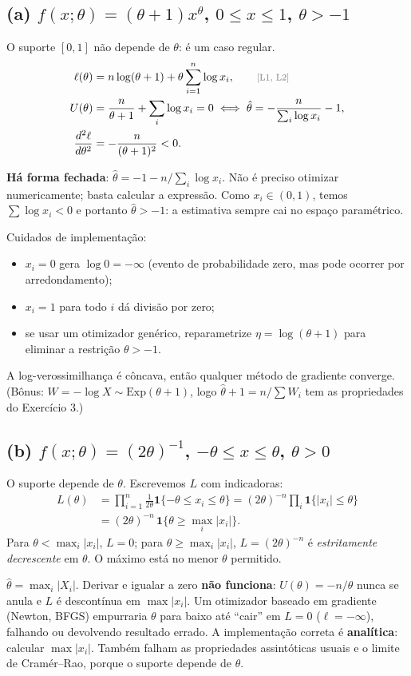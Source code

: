 \documentclass[11pt,a4paper]{article}
\newcommand{\ind}{\mathbf{1}}
\newcommand{\just}[1]{\tag*{\footnotesize\textcolor{gray}{[#1]}}}
\theoremstyle{definition}
\theoremstyle{plain}
\begin{document}
\subsection*{(a) $f(x;\theta)=(\theta+1)x^\theta$, $0\le x\le1$, $\theta>-1$}
O suporte $[0,1]$ não depende de $\theta$: é um caso regular.
\begin{align*}
\ell(\theta)&=n\log(\theta+1)+\theta\sum_{i=1}^n\log x_i, \just{L1, L2}\\
U(\theta)&=\frac{n}{\theta+1}+\sum_i\log x_i=0\iff\hat\theta=-\frac{n}{\sum_i\log x_i}-1,\\
\frac{d^2\ell}{d\theta^2}&=-\frac{n}{(\theta+1)^2}<0 .
\end{align*}
\begin{resposta}
\textbf{Há forma fechada}: $\hat\theta=-1-n/\sum_i\log x_i$. Não é preciso otimizar numericamente; basta calcular a expressão. Como $x_i\in(0,1)$, temos $\sum\log x_i<0$ e portanto $\hat\theta>-1$: a estimativa sempre cai no espaço paramétrico.

Cuidados de implementação:
\begin{itemize}[leftmargin=1.2em]
\item $x_i=0$ gera $\log0=-\infty$ (evento de probabilidade zero, mas pode ocorrer por arredondamento);
\item $x_i=1$ para todo $i$ dá divisão por zero;
\item se usar um otimizador genérico, reparametrize $\eta=\log(\theta+1)$ para eliminar a restrição $\theta>-1$.
\end{itemize}
A log-verossimilhança é côncava, então qualquer método de gradiente converge. (Bônus: $W=-\log X\sim\text{Exp}(\theta+1)$, logo $\hat\theta+1=n/\sum W_i$ tem as propriedades do Exercício 3.)
\end{resposta}

\subsection*{(b) $f(x;\theta)=(2\theta)^{-1}$, $-\theta\le x\le\theta$, $\theta>0$}
O suporte depende de $\theta$. Escrevemos $L$ com indicadoras:
\begin{align*}
L(\theta)&=\prod_{i=1}^n\frac{1}{2\theta}\ind\{-\theta\le x_i\le\theta\}
=(2\theta)^{-n}\prod_i\ind\{|x_i|\le\theta\}\\
&=(2\theta)^{-n}\,\ind\Big\{\theta\ge\max_i|x_i|\Big\}.
\end{align*}
Para $\theta<\max_i|x_i|$, $L=0$; para $\theta\ge\max_i|x_i|$, $L=(2\theta)^{-n}$ é \emph{estritamente decrescente} em $\theta$. O máximo está no menor $\theta$ permitido.
\begin{resposta}
$\hat\theta=\max_i|X_i|$. Derivar e igualar a zero \textbf{não funciona}: $U(\theta)=-n/\theta$ nunca se anula e $L$ é descontínua em $\max|x_i|$. Um otimizador baseado em gradiente (Newton, BFGS) empurraria $\theta$ para baixo até ``cair'' em $L=0$ ($\ell=-\infty$), falhando ou devolvendo resultado errado. A implementação correta é \textbf{analítica}: calcular $\max|x_i|$. Também falham as propriedades assintóticas usuais e o limite de Cramér--Rao, porque o suporte depende de $\theta$.
\end{resposta}
\end{document}
